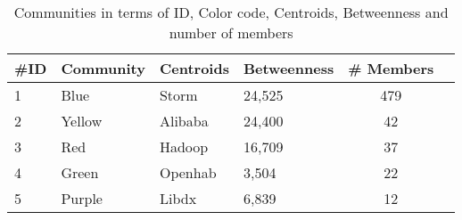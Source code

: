 
\begin{table}[]
\centering
\caption{Communities in terms of ID, Color code, Centroids, Betweenness and number of members}
\label{tab:communities}
\begin{tabular}{llllcc}
\hline
\#ID               & Community             & Centroids        & Betweenness & \# Members        \\ \hline
1                  & Blue                  & Storm &           24,525 &    479                                      \\ \hline
2                  & Yellow                & Alibaba          & 24,400      & 42                                      \\ \hline
3                  & Red                   & Hadoop           & 16,709      & 37                                      \\ \hline
4                  & Green                 & Openhab          & 3,504       & 22                                      \\ \hline
5                  & Purple                & Libdx              & 6,839       & 12  \\ \hline                                
\end{tabular}
\end{table}
